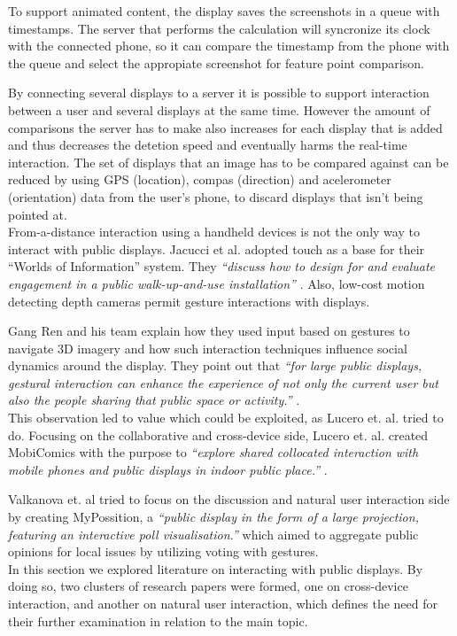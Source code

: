 To support animated content, the display saves the screenshots in a queue with timestamps. The server that performs the calculation will syncronize its clock with the connected phone, so it can compare the timestamp from the phone with the queue and select the appropiate screenshot for feature point comparison.

By connecting several displays  to a server it is possible to support interaction between a user and several displays at the same time. However the amount of comparisons the server has to make also increases for each display that is added and thus decreases the detetion speed and eventually harms the real-time interaction. The set of displays that an image has to be compared against can be reduced by using GPS (location), compas (direction) and acelerometer (orientation) data from the user's phone, to discard displays that isn't being pointed at. %
\\

From-a-distance interaction using a handheld devices is not the only way to interact with public displays. 
Jacucci et al. adopted touch as a base for their ``Worlds of Information'' system. 
They \emph{``discuss how to design for and evaluate engagement in a public walk-up-and-use installation''} \cite{Jacucci:2010}. %
Also, low-cost motion detecting depth cameras permit gesture interactions with displays. 


Gang Ren and his team explain how they used input based on gestures to navigate 3D imagery and how such interaction techniques influence social dynamics around the display. 
They point out that\emph{ ``for large public displays, gestural interaction can enhance the experience of not only the current user but also the people sharing that public space or activity.''} \cite{Ren:2013}.\\

This observation led to value which could be exploited, as Lucero et. al. tried to do. 
Focusing on the collaborative and cross-device side, Lucero et. al. created MobiComics with the purpose to \emph{``explore shared collocated interaction with mobile phones and public displays in indoor public place.''} \cite{Lucero:2012}. 

Valkanova et. al tried to focus on the discussion and natural user interaction side by creating MyPossition, a \emph{``public display in the form of a large projection, featuring an interactive poll visualisation.''} \cite{Valkanova:2014} which aimed to aggregate public opinions for local issues by utilizing voting with gestures.\\

In this section we explored literature on interacting with public displays. 
By doing so, two clusters of research papers were formed, one on cross-device interaction, and another on natural user interaction, which defines the need for their further examination in relation to the main topic.
